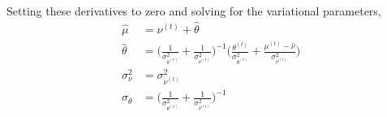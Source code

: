 \documentclass[10pt]{article}
\theoremstyle{plain}
\theoremstyle{definition}
\newcommand{\<}{\langle}
\renewcommand{\>}{\rangle}
\begin{document}
Setting these derivatives to zero and solving for the variational parameters, 
\begin{align}
\hat \mu &= \nu^{(t)} + \hat\theta\\
\hat \theta &= \Big(\frac{1}{\sigma^2_{\theta^{(t)}}}  + \frac{1}{\sigma^2_{\nu^{(t)}} }\Big)^{-1}\Big(\frac{\theta^{(t)}}{\sigma^2_{\theta^{(t)}}} + \frac{\mu^{(t)}  - \hat\nu}{\sigma^2_{\nu^{(t)}}}\Big)\\
\sigma_\nu^2 &= \sigma^2_{\nu^{(t)}}\\
\sigma_\theta &= \Big(\frac{1}{\sigma^2_{\theta^{(t)}}}  + \frac{1}{\sigma^2_{\nu^{(t)}} }\Big)^{-1}
\end{align}
\end{document}
